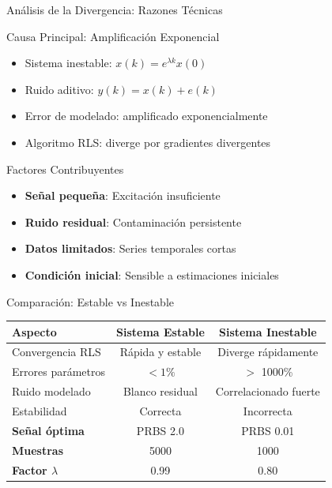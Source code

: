 \documentclass{beamer}
\begin{document}
\begin{frame}{Análisis de la Divergencia: Razones Técnicas}
\begin{block}{Causa Principal: Amplificación Exponencial}
\begin{itemize}
\item Sistema inestable: $x(k) = e^{\lambda k} x(0)$
\item Ruido aditivo: $y(k) = x(k) + e(k)$
\item Error de modelado: amplificado exponencialmente
\item Algoritmo RLS: diverge por gradientes divergentes
\end{itemize}
\end{block}

\begin{block}{Factores Contribuyentes}
\begin{itemize}
\item \textbf{Señal pequeña}: Excitación insuficiente
\item \textbf{Ruido residual}: Contaminación persistente
\item \textbf{Datos limitados}: Series temporales cortas
\item \textbf{Condición inicial}: Sensible a estimaciones iniciales
\end{itemize}
\end{block}
\end{frame}

\begin{frame}{Comparación: Estable vs Inestable}
\begin{center}
\begin{tabular}{l|c|c}
\textbf{Aspecto} & \textbf{Sistema Estable} & \textbf{Sistema Inestable} \\
\hline
Convergencia RLS & Rápida y estable & Diverge rápidamente \\
Errores parámetros & $< 1\%$ & $>$ 1000\% \\
Ruido modelado & Blanco residual & Correlacionado fuerte \\
Estabilidad & Correcta & Incorrecta \\
\hline
\textbf{Señal óptima} & PRBS 2.0 & PRBS 0.01 \\
\textbf{Muestras} & 5000 & 1000 \\
\textbf{Factor $\lambda$} & 0.99 & 0.80 \\
\end{tabular}
\end{center}
\end{frame}
\end{document}
